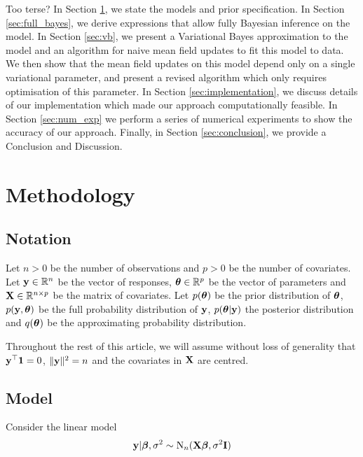 \documentclass{amsart}[12pt]
\newcommand{\mgc}[1]{{\color{blue}#1}}
\begin{document}
\mgc{Too terse?}
In Section \ref{sec:methodology}, we state the models and prior specification.
In Section \ref{sec:full_bayes}, we derive expressions that allow fully Bayesian inference on the model.
In Section \ref{sec:vb}, we present a Variational Bayes approximation to the model and an algorithm for naive mean field updates to fit this model to data. We then show that the mean
field updates on this model depend only on a single variational parameter, and present a revised algorithm which
only requires optimisation of this parameter.
In Section \ref{sec:implementation}, we discuss details of our implementation which made our approach 
computationally feasible.
In Section \ref{sec:num_exp} we perform a series of numerical experiments to show the accuracy of our approach. Finally, in Section \ref{sec:conclusion}, we provide a Conclusion and Discussion.


\section{Methodology}
\label{sec:methodology}

\subsection{Notation}


Let $n > 0$ be the number of observations and $p > 0$ be the number of covariates. Let ${\bf y} \in {\mathbb{R}}^n$ be the
vector of responses, ${\boldsymbol \theta} \in {\mathbb{R}}^p$ be the vector of parameters and ${\bf X} \in {\mathbb{R}}^{n \times p}$ be the
matrix of covariates. Let $p({\boldsymbol \theta})$ be the prior distribution of ${\boldsymbol \theta}$, $p({\bf y}, {\boldsymbol \theta})$ be the full
probability distribution of ${\bf y}$, $p({\boldsymbol \theta} | {\bf y})$ the posterior distribution and $q({\boldsymbol \theta})$ be the
approximating probability distribution. 

Throughout the rest of this article, we will assume without loss of generality that
${\bf y}^\top{\bf1} = 0$, $\|{\bf y}\|^2 = n$ and the covariates in ${\bf X}$ are centred.

\subsection{Model}
\label{sec:model}

Consider the linear model
\begin{align*}
	{\bf y} | {\boldsymbol \beta}, \sigma^2 \sim \text{N}_n({\bf X} {\boldsymbol \beta}, \sigma^2 {\bf I}) 
\end{align*}
\end{document}
